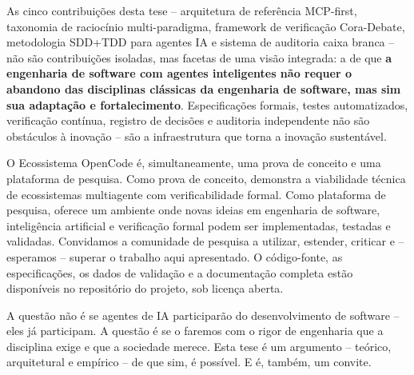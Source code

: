 \documentclass[12pt,a4paper,sumario=tradicional,openany]{abntex2}
\begin{document}
As cinco contribuições desta tese -- arquitetura de referência MCP-first, taxonomia de raciocínio multi-paradigma, framework de verificação Cora-Debate, metodologia SDD+TDD para agentes IA e sistema de auditoria caixa branca -- não são contribuições isoladas, mas facetas de uma visão integrada: a de que \textbf{a engenharia de software com agentes inteligentes não requer o abandono das disciplinas clássicas da engenharia de software, mas sim sua adaptação e fortalecimento}. Especificações formais, testes automatizados, verificação contínua, registro de decisões e auditoria independente não são obstáculos à inovação -- são a infraestrutura que torna a inovação sustentável.

O Ecossistema OpenCode é, simultaneamente, uma prova de conceito e uma plataforma de pesquisa. Como prova de conceito, demonstra a viabilidade técnica de ecossistemas multiagente com verificabilidade formal. Como plataforma de pesquisa, oferece um ambiente onde novas ideias em engenharia de software, inteligência artificial e verificação formal podem ser implementadas, testadas e validadas. Convidamos a comunidade de pesquisa a utilizar, estender, criticar e -- esperamos -- superar o trabalho aqui apresentado. O código-fonte, as especificações, os dados de validação e a documentação completa estão disponíveis no repositório do projeto, sob licença aberta.

A questão não é se agentes de IA participarão do desenvolvimento de software -- eles já participam. A questão é se o faremos com o rigor de engenharia que a disciplina exige e que a sociedade merece. Esta tese é um argumento -- teórico, arquitetural e empírico -- de que sim, é possível. E é, também, um convite.


\end{document}
